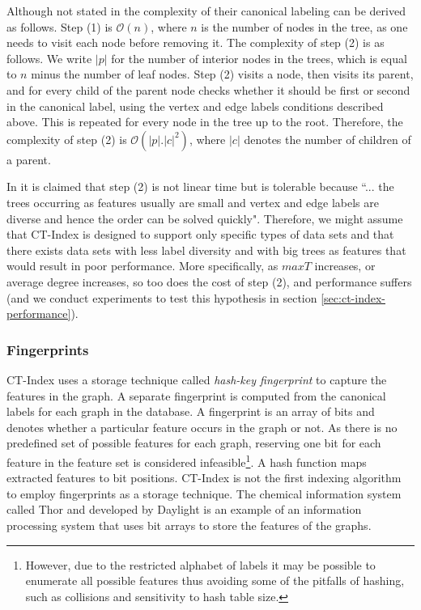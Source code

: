 \documentclass{l4proj}
\newcounter{example}[section]
\begin{document}
Although not stated in \cite{ctindex} the complexity of their canonical labeling can be derived as follows. Step (1) is $\mathcal{O}(n)$, where $n$ is the number of nodes in the tree, as one needs to visit each node before removing it. The complexity of step (2) is as follows. We write $|p|$ for the number of interior nodes in the trees, which is equal to $n$ minus the number of leaf nodes. Step (2) visits a node, then visits its parent, and for every child of the parent node checks whether it should be first or second in the canonical label, using the vertex and edge labels conditions described above. This is repeated for every node in the tree up to the root. Therefore, the complexity of step (2) is $\mathcal{O}(|p|.|c|^{2})$, where $|c|$ denotes the number of children of a parent.

In \cite{ctindex} it is claimed that step (2) is not linear time but is tolerable because ``... the trees occurring as features usually are small and vertex and edge labels are diverse and hence the order can be solved quickly". Therefore, we might assume that CT-Index is designed to support only specific types of data sets and that there exists data sets with less label diversity and with big trees as features that would result in poor performance. More specifically, as $maxT$ increases, or average degree increases, so too does the cost of step (2), and performance suffers (and we conduct experiments to test this hypothesis in section \ref{sec:ct-index-performance}).


\subsubsection{Fingerprints}
CT-Index uses a storage technique called \emph{hash-key fingerprint} to capture the features in the graph. A separate fingerprint is computed from the canonical labels for each graph in the database. A fingerprint is an array of bits and denotes whether a particular feature occurs in the graph or not. As there is no predefined set of possible features for each graph, reserving one bit for each feature in the feature set is considered infeasible\footnote{However, due to the restricted alphabet of labels it may be possible to enumerate all possible features thus avoiding some of the pitfalls of hashing, such as collisions and sensitivity to hash table size.}. A hash function maps extracted features to bit positions.
CT-Index is not the first indexing algorithm to employ fingerprints as a storage technique. The chemical information system called Thor and developed by Daylight \cite{fingerprints} is an example of an information processing system that uses bit arrays to store the features of the graphs.
\end{document}
